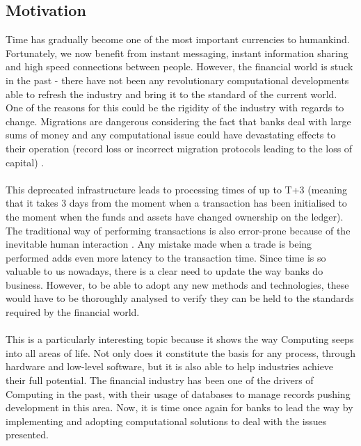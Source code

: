 \documentclass[12pt,twoside]{article}
\begin{document}
\subsection{Motivation}
\label{sub:Motivation}
Time has gradually become one of the most important currencies to humankind. Fortunately, we now benefit from instant messaging, instant information sharing and high speed connections between people. However, the financial world is stuck in the past - there have not been any revolutionary computational developments able to refresh the industry and bring it to the standard of the current world. One of the reasons for this could be the rigidity of the industry with regards to change. Migrations are dangerous considering the fact that banks deal with large sums of money and any computational issue could have devastating effects to their operation (record loss or incorrect migration protocols leading to the loss of capital) \cite{bankrisk}.
\\ \\
This deprecated infrastructure leads to processing times of up to T+3 \cite{TTimes} (meaning that it takes 3 days from the moment when a transaction has been initialised to the moment when the funds and assets have changed ownership on the ledger). The traditional way of performing transactions is also error-prone because of the inevitable human interaction \cite{humanrisk}. Any mistake made when a trade is being performed adds even more latency to the transaction time. Since time is so valuable to us nowadays, there is a clear need to update the way banks do business. However, to be able to adopt any new methods and technologies, these would have to be thoroughly analysed to verify they can be held to the standards required by the financial world.
\\ \\ 
This is a particularly interesting topic because it shows the way Computing seeps into all areas of life. Not only does it constitute the basis for any process, through hardware and low-level software, but it is also able to help industries achieve their full potential. The financial industry has been one of the drivers of Computing in the past, with their usage of databases to manage records pushing development in this area. Now, it is time once again for banks to lead the way by implementing and adopting computational solutions to deal with the issues presented.
\end{document}
